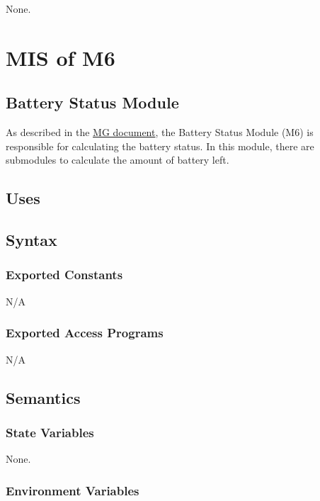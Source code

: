 None.



\section{MIS of M6} \label{BatteryStatus} 

\subsection{Battery Status Module}

As described in the \href{https://github.com/NevoAbigail/Capstone/blob/main/docs/Design/SoftArchitecture/MG.pdf}{MG document}, the Battery Status Module (M6) is responsible for calculating the battery status. In this module, there are submodules to calculate the amount of battery left.

\subsection{Uses}


\subsection{Syntax}

\subsubsection{Exported Constants}

N/A

\subsubsection{Exported Access Programs}

N/A

\subsection{Semantics}

\subsubsection{State Variables}

None.


\subsubsection{Environment Variables}

